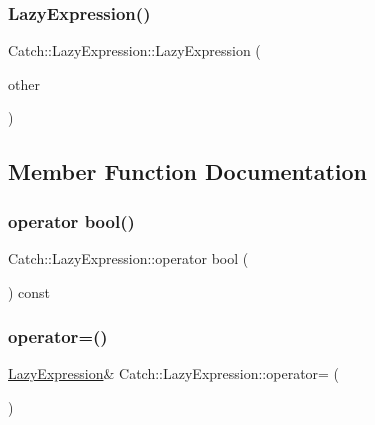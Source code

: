 \subsubsection{\texorpdfstring{LazyExpression()}{LazyExpression()}\hspace{0.1cm}{\footnotesize\ttfamily [2/2]}}
{\footnotesize\ttfamily Catch\+::\+Lazy\+Expression\+::\+Lazy\+Expression (\begin{DoxyParamCaption}\item[{\mbox{\hyperlink{class_catch_1_1_lazy_expression}{Lazy\+Expression}} const \&}]{other }\end{DoxyParamCaption})}



\subsection{Member Function Documentation}
\mbox{\label{class_catch_1_1_lazy_expression_acdb846cb230cecfc6aca7a925b31fbca}} 
\subsubsection{\texorpdfstring{operator bool()}{operator bool()}}
{\footnotesize\ttfamily Catch\+::\+Lazy\+Expression\+::operator bool (\begin{DoxyParamCaption}{ }\end{DoxyParamCaption}) const\hspace{0.3cm}{\ttfamily [explicit]}}

\mbox{\label{class_catch_1_1_lazy_expression_ae4ae00d4f36f084c369f2da36565a822}} 
\subsubsection{\texorpdfstring{operator=()}{operator=()}}
{\footnotesize\ttfamily \mbox{\hyperlink{class_catch_1_1_lazy_expression}{Lazy\+Expression}}\& Catch\+::\+Lazy\+Expression\+::operator= (\begin{DoxyParamCaption}\item[{\mbox{\hyperlink{class_catch_1_1_lazy_expression}{Lazy\+Expression}} const \&}]{ }\end{DoxyParamCaption})\hspace{0.3cm}{\ttfamily [delete]}}



